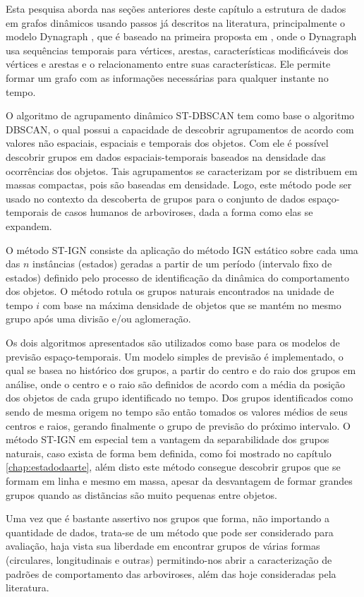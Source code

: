 Esta pesquisa aborda nas seções anteriores deste capítulo a estrutura de dados em grafos dinâmicos usando passos já descritos na literatura, principalmente o modelo Dynagraph \cite{dynagraph}, que é baseado na primeira proposta em \cite{dynagraph2012}, onde o Dynagraph usa sequências temporais para vértices, arestas, características modificáveis dos vértices e arestas e o relacionamento entre suas características. Ele permite formar um grafo com as informações necessárias para qualquer instante no tempo. 

O algoritmo de agrupamento dinâmico \acrshort{ST-DBSCAN} tem como base o algoritmo \acrshort{DBSCAN}, o qual possui a capacidade de descobrir agrupamentos de acordo com valores não espaciais, espaciais e temporais dos objetos. Com ele é possível descobrir grupos em dados espaciais-temporais baseados na densidade das ocorrências dos objetos. Tais agrupamentos se caracterizam por se distribuem em massas compactas, pois são baseadas em densidade. Logo, este método pode ser usado no contexto da descoberta de grupos para o conjunto de dados espaço-temporais de casos humanos de arboviroses, dada a forma como elas se expandem. 

O método \acrshort{ST-IGN} consiste da aplicação do método \acrshort{IGN} estático \cite{simposioNeg2003} sobre cada uma das $n$ instâncias (estados) geradas a partir de um período (intervalo fixo de estados) definido pelo processo de identificação da dinâmica do comportamento dos objetos. O método rotula os grupos naturais encontrados na unidade de tempo $i$ com base na máxima densidade de objetos que se mantém no mesmo grupo após uma divisão e/ou aglomeração.

Os dois algoritmos apresentados são utilizados como base para os modelos de previsão espaço-temporais. Um modelo simples de previsão é implementado, o qual se basea no histórico dos grupos, a partir do centro e do raio dos grupos em análise, onde o centro e o raio são definidos de acordo com a média da posição dos objetos de cada grupo identificado no tempo. Dos grupos identificados como sendo de mesma origem no tempo são então tomados os valores médios de seus centros e raios, gerando finalmente o grupo de previsão do próximo intervalo. O método \acrshort{ST-IGN} em especial tem a vantagem da separabilidade dos grupos naturais, caso exista de forma bem definida, como foi mostrado no capítulo \ref{chap:estadodaarte}, além disto este método consegue descobrir grupos que se formam em linha e mesmo em massa, apesar da desvantagem de formar grandes grupos quando as distãncias são muito pequenas entre objetos.

Uma vez que é bastante assertivo nos grupos que forma, não importando a quantidade de dados, trata-se de um método que pode ser considerado para avaliação, haja vista sua liberdade em encontrar grupos de várias formas (circulares, longitudinais e outras) permitindo-nos abrir a caracterização de padrões de comportamento das arboviroses, além das hoje consideradas pela literatura.